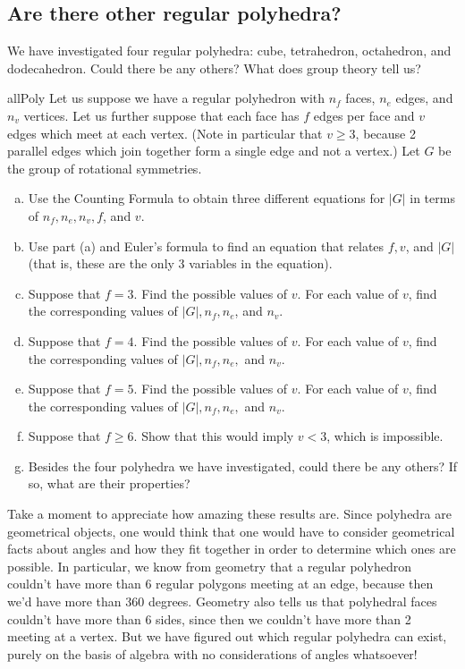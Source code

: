 \subsection{Are there  other regular polyhedra?}

We have investigated four regular polyhedra: cube, tetrahedron, octahedron, and dodecahedron.  Could there be any others?  What does group theory tell us? 


\begin{exercise}{allPoly}
Let us suppose we have a regular polyhedron with $n_f$ faces, $n_e$ edges, and $n_v$ vertices.  Let us further suppose that each face has $f$ edges per face and $v$ edges which meet at each vertex. (Note in particular that $v \ge 3$, because 2 parallel edges which join together form a single edge and not a vertex.) Let $G$ be the group of rotational symmetries.
\begin{enumerate}[(a)]
\item
Use the Counting Formula to obtain three different equations for $|G|$ in terms of $n_f, n_e, n_v, f$, and $v$.
\item
Use part (a) and Euler's formula to find an equation that relates $f, v$, and $|G|$ (that is, these are the only 3 variables in the equation).
\item
Suppose that $f=3$.  Find the possible values of $v$.  For each value of $v$, find the corresponding values of $|G|, n_f, n_e$, and $n_v$.
\item
Suppose that $f=4$.  Find the possible values of $v$.  For each value of $v$, find the corresponding values of $|G|, n_f, n_e,$ and $n_v$.
\item
Suppose that $f=5$.  Find the possible values of $v$.  For each value of $v$, find the corresponding values of $|G|, n_f, n_e,$ and $n_v$.
\item
Suppose that $f \ge 6$. Show that this would imply $v<3$, which is impossible.
\item
Besides the four polyhedra we have investigated, could there be any others? If so, what are their properties?
\end{enumerate}
\end{exercise}

Take a moment to appreciate how amazing these results are.  Since polyhedra are geometrical objects, one would think that one would have to consider geometrical facts about angles and how they fit together in order to determine which ones are possible.  In particular, we know from geometry that a regular polyhedron couldn't have more than 6 regular polygons meeting at an edge, because then we'd have more than 360 degrees. Geometry also tells us that polyhedral faces couldn't have more than 6 sides, since then we couldn't have more than 2 meeting at a vertex. But we have figured out which regular polyhedra can exist, purely on the basis of algebra with no considerations of angles whatsoever!  

